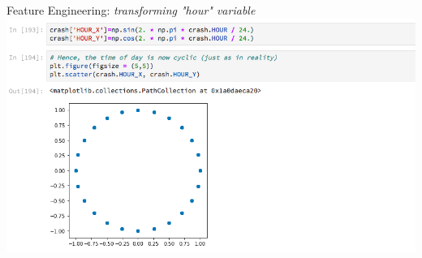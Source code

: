 \documentclass[notes]{beamer}
\begin{document}
\begin{frame}{Feature Engineering: \textit{transforming "hour" variable}}
	\includegraphics[scale=.37]{Figures/hour}
\end{frame}
\end{document}
